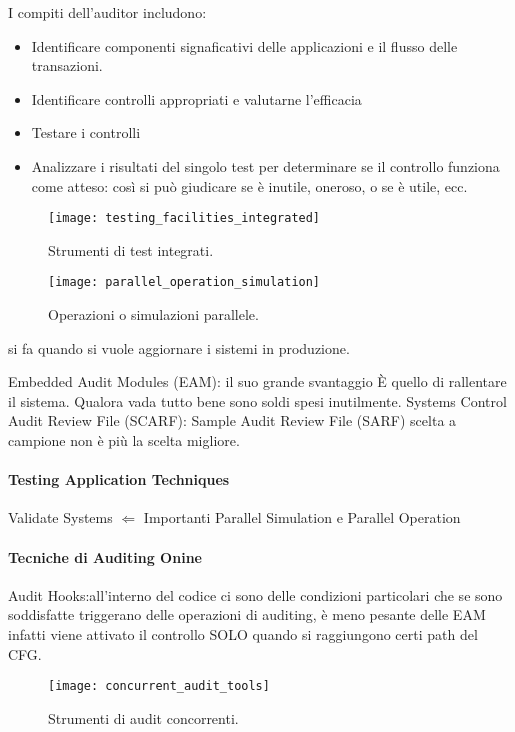 I compiti dell'auditor includono:
\begin{itemize}
\item Identificare componenti signaficativi delle applicazioni e 
il flusso delle transazioni.
\item 
Identificare controlli appropriati e valutarne l'efficacia
\item 
Testare i controlli
\item Analizzare i risultati del singolo test per determinare se 
il controllo funziona come atteso: così si può giudicare se è inutile,
oneroso, o se è utile, ecc.
\end{itemize}

\begin{figure}[h!]
        \begin{center}
                \texttt{[image: testing\_facilities\_integrated]}
        \end{center}
        \caption{Strumenti di test integrati.}
        \label{fig:testing:facilities:integrated}
\end{figure}

\begin{figure}[h!]
        \begin{center}
                \texttt{[image: parallel\_operation\_simulation]}
        \end{center}
        \caption{Operazioni o simulazioni parallele.}
        \label{fig:testing:facilities:parallel}
\end{figure}
si fa quando si vuole aggiornare i sistemi in produzione.

Embedded Audit Modules (EAM): il suo grande svantaggio È quello di rallentare il
sistema. Qualora vada tutto bene sono soldi spesi inutilmente.
Systems Control Audit Review File (SCARF):
Sample Audit Review File (SARF) scelta a campione non è più la scelta migliore.

\paragraph{Testing Application Techniques}
Validate Systems $\Leftarrow$ Importanti Parallel Simulation e Parallel
Operation



\paragraph{Tecniche di Auditing Onine}
Audit Hooks:all'interno del codice ci sono delle condizioni particolari che se
sono soddisfatte triggerano delle operazioni di auditing, è meno pesante delle
EAM infatti viene attivato il controllo SOLO quando si raggiungono certi path
del CFG.
\begin{figure}[h!]
        \begin{center}
                \texttt{[image: concurrent\_audit\_tools]}
        \end{center}
        \caption{Strumenti di audit concorrenti.}
        \label{fig:concurrent:audit:tools}
\end{figure}

